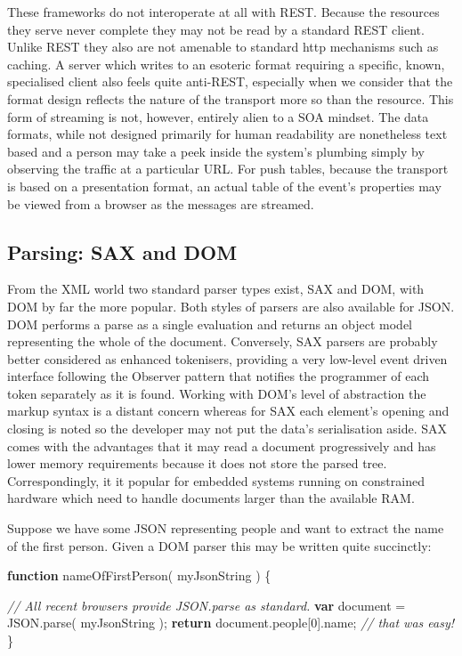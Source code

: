 \documentclass[12pt, ]{article}
\newenvironment{Shaded}{}{}
\newcommand{\KeywordTok}[1]{\textcolor[rgb]{0.00,0.44,0.13}{\textbf{{#1}}}}
\newcommand{\DecValTok}[1]{\textcolor[rgb]{0.25,0.63,0.44}{{#1}}}
\newcommand{\CommentTok}[1]{\textcolor[rgb]{0.38,0.63,0.69}{\textit{{#1}}}}
\newcommand{\OtherTok}[1]{\textcolor[rgb]{0.00,0.44,0.13}{{#1}}}
\newcommand{\FunctionTok}[1]{\textcolor[rgb]{0.02,0.16,0.49}{{#1}}}
\newcommand{\NormalTok}[1]{{#1}}
\begin{document}
These frameworks do not interoperate at all with REST. Because the
resources they serve never complete they may not be read by a standard
REST client. Unlike REST they also are not amenable to standard http
mechanisms such as caching. A server which writes to an esoteric format
requiring a specific, known, specialised client also feels quite
anti-REST, especially when we consider that the format design reflects
the nature of the transport more so than the resource. This form of
streaming is not, however, entirely alien to a SOA mindset. The data
formats, while not designed primarily for human readability are
nonetheless text based and a person may take a peek inside the system's
plumbing simply by observing the traffic at a particular URL. For push
tables, because the transport is based on a presentation format, an
actual table of the event's properties may be viewed from a browser as
the messages are streamed.

\subsection{Parsing: SAX and DOM}\label{parsing-sax-and-dom}

From the XML world two standard parser types exist, SAX and DOM, with
DOM by far the more popular. Both styles of parsers are also available
for JSON. DOM performs a parse as a single evaluation and returns an
object model representing the whole of the document. Conversely, SAX
parsers are probably better considered as enhanced tokenisers, providing
a very low-level event driven interface following the Observer pattern
that notifies the programmer of each token separately as it is found.
Working with DOM's level of abstraction the markup syntax is a distant
concern whereas for SAX each element's opening and closing is noted so
the developer may not put the data's serialisation aside. SAX comes with
the advantages that it may read a document progressively and has lower
memory requirements because it does not store the parsed tree.
Correspondingly, it it popular for embedded systems running on
constrained hardware which need to handle documents larger than the
available RAM.

Suppose we have some JSON representing people and want to extract the
name of the first person. Given a DOM parser this may be written quite
succinctly:

\begin{Shaded}
\begin{Highlighting}[]
\KeywordTok{function} \FunctionTok{nameOfFirstPerson}\NormalTok{( myJsonString ) \{}

   \CommentTok{// All recent browsers provide JSON.parse as standard. }
   \KeywordTok{var} \NormalTok{document = }\OtherTok{JSON}\NormalTok{.}\FunctionTok{parse}\NormalTok{( myJsonString );}
   \KeywordTok{return} \OtherTok{document}\NormalTok{.}\FunctionTok{people}\NormalTok{[}\DecValTok{0}\NormalTok{].}\FunctionTok{name}\NormalTok{; }\CommentTok{// that was easy!}
\NormalTok{\}}
\end{Highlighting}
\end{Shaded}
\end{document}
